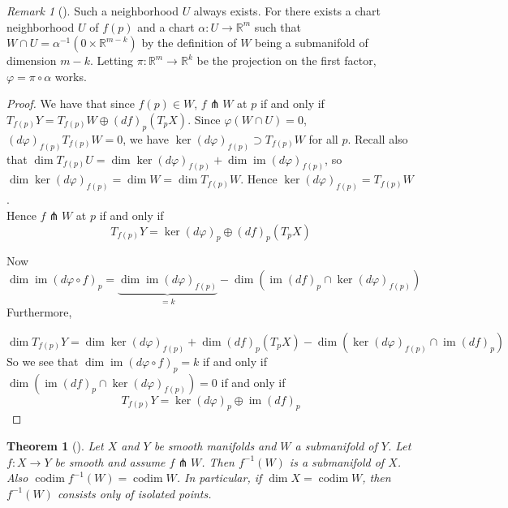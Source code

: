 \documentclass[reqno]{amsart}
\newtheorem{theorem}{Theorem}[section]
\theoremstyle{definition}
\theoremstyle{remark}
\newtheorem*{remark}{Remark}
\DeclareMathOperator{\im}{im}
\DeclareMathOperator{\codim}{codim}
\begin{document}
\begin{remark}[]
    Such a neighborhood $U$ always exists. For there exists
    a chart neighborhood $U$ of $f(p)$ and
    a chart $\alpha \colon U \to \mathbb{R}^{m}$ such that
    $W \cap U = \alpha^{-1} \left( 0\times \mathbb{R}^{m-k} \right) $ 
    by the definition of $W$ being a submanifold of
    dimension $m-k$. Letting $\pi \colon
    \mathbb{R}^{m}\to \mathbb{R}^{k}$ be the projection
    on the first factor, $\varphi = \pi \circ \alpha$ works.
\end{remark}

\begin{proof}
    We have that since
    $f(p) \in W$,
    $f \pitchfork W$ at $p$ if and only if
    $T_{f(p)} Y = T_{f(p)} W \oplus
    (df)_p \left( T_p X \right) $.
    Since
    $\varphi \left( W \cap U \right) 
    = 0$,
    $(d \varphi)_{f(p)} T_{f(p)}W = 0$, we have
    $\ker \left( d \varphi  \right)_{f(p)}
    \supset T_{f(p)} W$ for all $ p$.
    Recall also that
    $\dim T_{f(p)} U = \dim \ker \left( d \varphi  \right)_{f(p)}
    + \dim \im \left( d \varphi  \right)_{f(p)}$, so
    $\dim \ker \left( d\varphi  \right)_{f(p)}= 
    \dim W = \dim T_{f(p)}W$. Hence
    $\ker \left( d \varphi  \right)_{f(p)}=
    T_{f(p)}W$.\\
    Hence $f \pitchfork W$ at $p$ if and only if
    \[
        T_{f(p)} Y =
        \ker \left( d \varphi  \right)_p 
        \oplus \left( df \right)_p \left( T_pX \right) 
    \] 

    Now
    \[
    \dim \im \left( d \varphi \circ f \right)_p
    = \underbrace{\dim \im \left( d \varphi  \right)_{f(p)}}_{=k}
    - \dim \left( \im (df)_p \cap \ker (d \varphi )_{f(p)} \right) 
    \] 
    Furthermore,

    \[
        \dim T_{f(p)} Y =
        \dim \ker \left( d \varphi  \right)_{f(p)}
        + \dim \left( df \right)_p \left( T_pX \right) -
        \dim \left( \ker \left( d\varphi  \right)_{f(p)}
        \cap \im (df)_{p} \right) 
    \] 
    So we see that
    $\dim \im \left( d \varphi \circ f \right)_p
    = k$ if and only if
    $\dim \left( \im (df)_p \cap \ker \left( d
    \varphi \right)_{f(p)} \right) = 0$ if and only
    if
    \[
    T_{f(p)}Y = \ker \left( d \varphi  \right)_p
    \oplus \im \left( df \right)_p
    \] 
\end{proof}




\begin{theorem}[]
    Let $X$ and $Y$ be smooth manifolds and $W$ a submanifold of
    $Y$.
    Let $f \colon X \to Y$ be smooth and assume
    $f \pitchfork W$. Then
    $f^{-1}(W)$ is a submanifold of $X$. Also
    $\codim f^{-1}(W) = \codim W$. In particular,
    if $\dim X = \codim W$, then
    $f^{-1}(W)$ consists only of isolated points.
\end{theorem}
\end{document}
